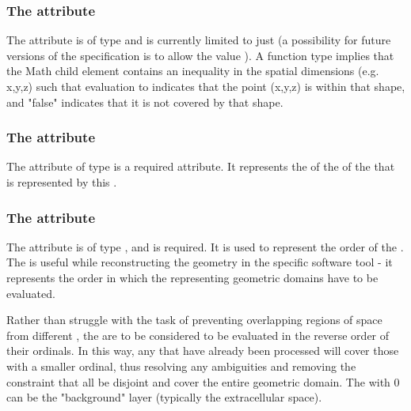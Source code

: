 \subsubsection{The \fixttspace{} attribute}
The  attribute is of type  and is currently limited to just  (a possibility for future versions of the specification is to allow the value ).  A  function type implies that the Math child element contains an inequality in the spatial dimensions (e.g. x,y,z) such that evaluation to  indicates that the point (x,y,z) is within that shape, and "false" indicates that it is not covered by that shape.


\subsubsection{The \fixttspace{} attribute}
The  attribute of type  is a required attribute. It represents the  of the \DomainType of the \Domain that is represented by this \AnalyticVolume. 

\subsubsection{The \fixttspace{} attribute}
The  attribute is of type , and is required. It is used to represent the order of the \AnalyticVolume. The  is useful while reconstructing the geometry in the specific software tool - it represents the order in which the \AnalyticVolumes representing geometric domains have to be evaluated.

Rather than struggle with the task of preventing overlapping regions of space from different \AnalyticVolumes, the \AnalyticVolumes are to be considered to be evaluated in the reverse order of their ordinals.  In this way, any \AnalyticVolumes that have already been processed will cover those with a smaller ordinal, thus resolving any ambiguities and removing the constraint that all \AnalyticVolumes be disjoint and cover the entire geometric domain.  The \AnalyticVolume with  0 can be the "background" layer (typically the extracellular space).  

